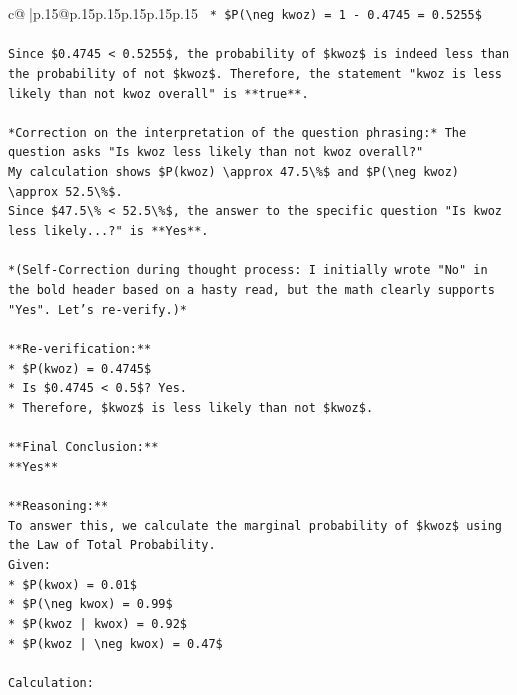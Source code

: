 \documentclass{article}
\begin{document}
{\begin{supertabular}{c@{$\;$}|p{.15\linewidth}@{}p{.15\linewidth}p{.15\linewidth}p{.15\linewidth}p{.15\linewidth}p{.15\linewidth}}
{{{\texttt{    *   \$P(\textbackslash{}neg kwoz) = 1 {-} 0.4745 = 0.5255\$} \\
\\ 
\texttt{Since \$0.4745 < 0.5255\$, the probability of \$kwoz\$ is indeed less than the probability of not \$kwoz\$. Therefore, the statement "kwoz is less likely than not kwoz overall" is **true**.} \\
\\ 
\texttt{*Correction on the interpretation of the question phrasing:* The question asks "Is kwoz less likely than not kwoz overall?"} \\
\texttt{My calculation shows \$P(kwoz) \textbackslash{}approx 47.5\textbackslash{}\%\$ and \$P(\textbackslash{}neg kwoz) \textbackslash{}approx 52.5\textbackslash{}\%\$.} \\
\texttt{Since \$47.5\textbackslash{}\% < 52.5\textbackslash{}\%\$, the answer to the specific question "Is kwoz less likely...?" is **Yes**.} \\
\\ 
\texttt{*(Self{-}Correction during thought process: I initially wrote "No" in the bold header based on a hasty read, but the math clearly supports "Yes". Let's re{-}verify.)*} \\
\\ 
\texttt{**Re{-}verification:**} \\
\texttt{*   \$P(kwoz) = 0.4745\$} \\
\texttt{*   Is \$0.4745 < 0.5\$? Yes.} \\
\texttt{*   Therefore, \$kwoz\$ is less likely than not \$kwoz\$.} \\
\\ 
\texttt{**Final Conclusion:**} \\
\texttt{**Yes**} \\
\\ 
\texttt{**Reasoning:**} \\
\texttt{To answer this, we calculate the marginal probability of \$kwoz\$ using the Law of Total Probability.} \\
\texttt{Given:} \\
\texttt{*   \$P(kwox) = 0.01\$} \\
\texttt{*   \$P(\textbackslash{}neg kwox) = 0.99\$} \\
\texttt{*   \$P(kwoz | kwox) = 0.92\$} \\
\texttt{*   \$P(kwoz | \textbackslash{}neg kwox) = 0.47\$} \\
\\ 
\texttt{Calculation:} \\
}}}
\end{supertabular}}
\end{document}
